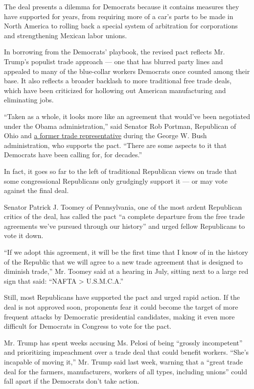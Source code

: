 The deal presents a dilemma for Democrats because it contains measures
they have supported for years, from requiring more of a car's parts to
be made in North America to rolling back a special system of arbitration
for corporations and strengthening Mexican labor unions.

In borrowing from the Democrats' playbook, the revised pact reflects Mr.
Trump's populist trade approach --- one that has blurred party lines and
appealed to many of the blue-collar workers Democrats once counted among
their base. It also reflects a broader backlash to more traditional free
trade deals, which have been criticized for hollowing out American
manufacturing and eliminating jobs.

``Taken as a whole, it looks more like an agreement that would've been
negotiated under the Obama administration,'' said Senator Rob Portman,
Republican of Ohio and
\href{https://www.nytimes3xbfgragh.onion/2005/03/18/business/congressman-from-ohio-is-chosen-for-trade-post.html}{a
former trade representative} during the George W. Bush administration,
who supports the pact. ``There are some aspects to it that Democrats
have been calling for, for decades.''

In fact, it goes so far to the left of traditional Republican views on
trade that some congressional Republicans only grudgingly support it ---
or may vote against the final deal.

Senator Patrick J. Toomey of Pennsylvania, one of the most ardent
Republican critics of the deal, has called the pact ``a complete
departure from the free trade agreements we've pursued through our
history'' and urged fellow Republicans to vote it down.

``If we adopt this agreement, it will be the first time that I know of
in the history of the Republic that we will agree to a new trade
agreement that is designed to diminish trade,'' Mr. Toomey said at a
hearing in July, sitting next to a large red sign that said: ``NAFTA
\textgreater{} U.S.M.C.A.''

Still, most Republicans have supported the pact and urged rapid action.
If the deal is not approved soon, proponents fear it could become the
target of more frequent attacks by Democratic presidential candidates,
making it even more difficult for Democrats in Congress to vote for the
pact.

Mr. Trump has spent weeks accusing Ms. Pelosi of being ``grossly
incompetent'' and prioritizing impeachment over a trade deal that could
benefit workers. ``She's incapable of moving it,'' Mr. Trump said last
week, warning that a ``great trade deal for the farmers, manufacturers,
workers of all types, including unions'' could fall apart if the
Democrats don't take action.

